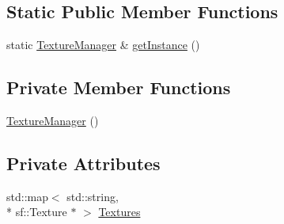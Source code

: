\subsection*{Static Public Member Functions}
\begin{DoxyCompactItemize}
\item 
static \hyperlink{class_texture_manager}{Texture\-Manager} \& \hyperlink{class_texture_manager_a0a6bc63e2f6fa7e1d0aee5b24cfa089a}{get\-Instance} ()
\end{DoxyCompactItemize}
\subsection*{Private Member Functions}
\begin{DoxyCompactItemize}
\item 
\hyperlink{class_texture_manager_ad76abb178b37cedf4514eb0154349935}{Texture\-Manager} ()
\end{DoxyCompactItemize}
\subsection*{Private Attributes}
\begin{DoxyCompactItemize}
\item 
std\-::map$<$ std\-::string, \\*
sf\-::\-Texture $\ast$ $>$ \hyperlink{class_texture_manager_a7b3ea39ee8017ce3a7b5826bab1d2e04}{Textures}
\end{DoxyCompactItemize}


